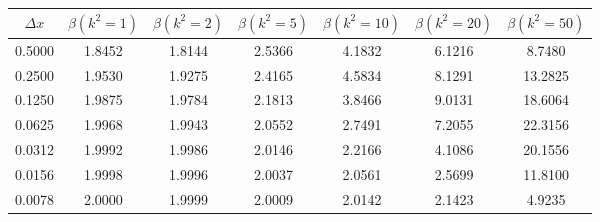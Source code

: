 \begin{tabular}{|c|c|c|c|c|c|c|}
\hline
\textbf{$\Delta x$}&\textbf{$\beta(k^2=1)$}&\textbf{$\beta(k^2=2)$}&\textbf{$\beta(k^2=5)$}&\textbf{$\beta(k^2=10)$}&\textbf{$\beta(k^2=20)$}&\textbf{$\beta(k^2=50)$}\\\hline
0.5000&1.8452&1.8144&2.5366&4.1832&6.1216&8.7480\\\hline
0.2500&1.9530&1.9275&2.4165&4.5834&8.1291&13.2825\\\hline
0.1250&1.9875&1.9784&2.1813&3.8466&9.0131&18.6064\\\hline
0.0625&1.9968&1.9943&2.0552&2.7491&7.2055&22.3156\\\hline
0.0312&1.9992&1.9986&2.0146&2.2166&4.1086&20.1556\\\hline
0.0156&1.9998&1.9996&2.0037&2.0561&2.5699&11.8100\\\hline
0.0078&2.0000&1.9999&2.0009&2.0142&2.1423&4.9235\\\hline
\end{tabular}
